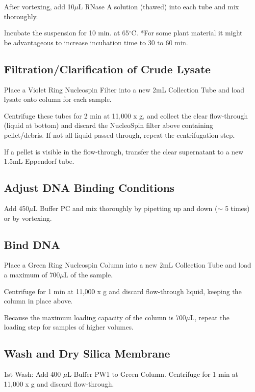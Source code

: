 \documentclass[12pt]{../SOP3_alpha}\usepackage[]{graphicx}\usepackage[]{color}
\begin{document}
\NP After vortexing, add 10$\mu$L RNase A solution (thawed) into each tube and mix thoroughly.

\NP Incubate the suspension for 10 min. at 65$^\circ$C. *For some plant material it might be advantageous to increase incubation time to 30 to 60 min. 

\subsection*{Filtration/Clarification of Crude Lysate}

\NP Place a Violet Ring Nucleospin Filter into a new 2mL Collection Tube and load lysate onto column for each sample. 

\NP Centrifuge these tubes for 2 min at 11,000 x g, and collect the clear flow-through (liquid at bottom) and discard the NucleoSpin filter above containing pellet/debris. If not all liquid passed through, repeat the centrifugation step.

\NP If a pellet is visible in the flow-through, transfer the clear supernatant to a new 1.5mL Eppendorf tube. 


\subsection*{Adjust DNA Binding Conditions}

\NP Add 450$\mu$L Buffer PC and mix thoroughly by pipetting up and down ($\sim$ 5 times) or by vortexing.


\subsection*{Bind DNA}

\NP Place a Green Ring Nucleospin Column into a new 2mL Collection Tube and load a maximum of 700$\mu$L of the sample.

\NP Centrifuge for 1 min at 11,000 x g and discard flow-through liquid, keeping the column in place above. 

\NP Because the maximum loading capacity of the column is 700$\mu$L, repeat the loading step for samples of higher volumes.

\subsection*{Wash and Dry Silica Membrane}

\NP 1st Wash: Add 400 $\mu$L Buffer PW1 to Green Column. Centrifuge for 1 min at 11,000 x g and discard flow-through.
\end{document}
